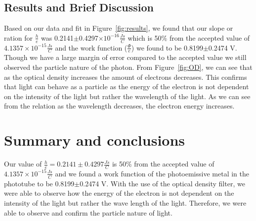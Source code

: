 \documentclass[11pt,letterpaper,onecolumn]{article}
\begin{document}
\subsection{Results and Brief Discussion}

Based on our data and fit in Figure~\ref{fig:results}, we found that our slope or ration for $\frac{h}{e}$ was 0.2141$\pm$0.4297$\times10^{-16}\frac{Js}{C}$ which is 50$\%$ from the accepted value of $4.1357\times10^{-15}\frac{Js}{C}$ and the work function ($\frac{\Phi{}}{e}$) we found to be 0.8199$\pm$0.2474 V. Though we have a large margin of error compared to the accepted value we still observed the particle nature of the photon. From Figure~\ref{fig:OD}, we can see that as the optical density increases the amount of electrons decreases. This confirms that light can behave as a particle as the energy of the electron is not dependent on the intensity of the light but rather the wavelength of the light. As we can see from the relation as the wavelength decreases, the electron energy increases.   


\section{Summary and conclusions}

Our value of $\frac{h}{e}  = 0.2141\pm0.4297\frac{Js}{C} $ is 50$\%$ from the accepted value of $4.1357\times10^{-15}\frac{Js}{C}$ and we found a work function of the photoemissive metal in the phototube to be 0.8199$\pm$0.2474 V. With the use of the optical density filter, we were able to observe how the energy of the electron is not dependent on the intensity of the light but rather the wave length of the light. Therefore, we were able to observe and confirm the particle nature of light.

\end{document}
